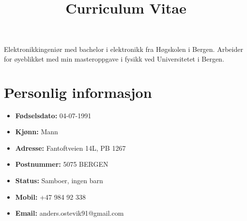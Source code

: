 \documentclass[11pt,a4paper,sans,norsk]{moderncv}        %
\title{Curriculum Vitae}                               %
\begin{document}
\makecvtitle

\small{Elektronikkingeniør med bachelor i elektronikk fra Høgskolen i Bergen. Arbeider for øyeblikket med min masteroppgave i fysikk ved Universitetet i Bergen.}

\section{Personlig informasjon}

\begin{minipage}{0.45\textwidth}
	{\renewcommand\labelitemi{}
	\begin{itemize}
	\vspace{3pt}
	\item{\textbf{Fødselsdato:}	04-07-1991}
	\vspace{3pt}
	\item{\textbf{Kjønn:}	Mann}
	\vspace{3pt}
	\item{\textbf{Adresse:}	Fantoftveien 14L, PB 1267}
	\vspace{3pt}
	\item{\textbf{Postnummer:}	5075 BERGEN}
	\vspace{3pt}
	\item{\textbf{Status:}	Samboer, ingen barn}
	\vspace{3pt}
	\item{\textbf{Mobil:}	+47 984 92 338}
	\vspace{3pt}
	\item{\textbf{Email:}	anders.ostevik91@gmail.com}

	\end{itemize}
	}
\end{minipage} \hfill
\begin{minipage}{0.85\textwidth}
	\begin{figure}[H]
	\setlength{\fboxsep}{1pt}
	\setlength{\fboxrule}{0.1pt}
	\end{figure}
\end{minipage}
\end{document}
